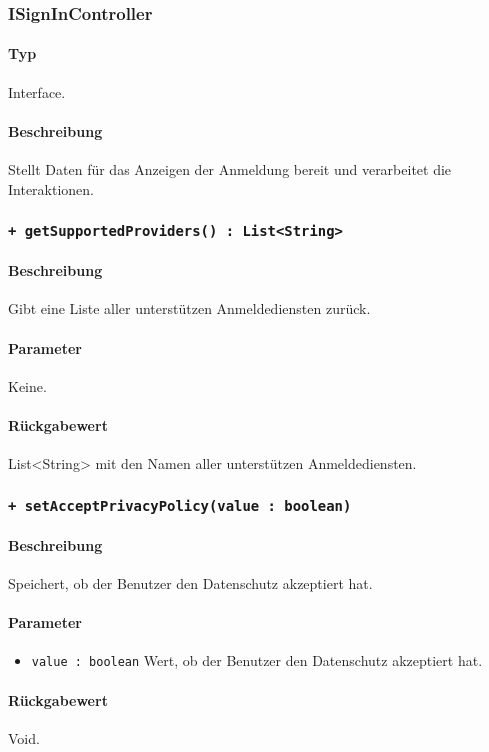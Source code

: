 \subsubsection{ISignInController}
\paragraph*{Typ}
Interface.
\paragraph*{Beschreibung}
Stellt Daten für das Anzeigen der Anmeldung bereit und verarbeitet die Interaktionen.

\subsubsection{\texttt{+ getSupportedProviders() : List<String>}}%
\paragraph*{Beschreibung}
Gibt eine Liste aller unterstützen Anmeldediensten zurück.
\paragraph*{Parameter}
Keine.
\paragraph*{Rückgabewert}
List<String> mit den Namen aller unterstützen Anmeldediensten.

\subsubsection{\texttt{+ setAcceptPrivacyPolicy(value : boolean)}}%
\paragraph*{Beschreibung}
Speichert, ob der Benutzer den Datenschutz akzeptiert hat.
\paragraph*{Parameter}
\begin{itemize}
    \item \texttt{value : boolean} Wert, ob der Benutzer den Datenschutz akzeptiert hat.
\end{itemize}
\paragraph*{Rückgabewert}
Void.

